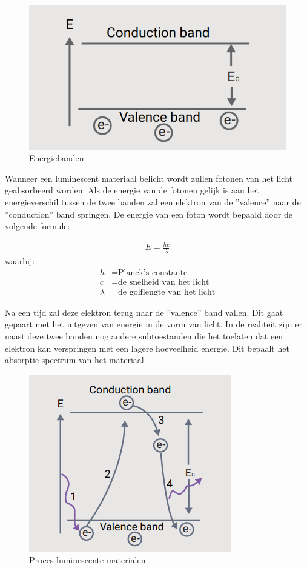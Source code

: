 \begin{figure}[H]
    \centering
    \includegraphics[width=0.6\linewidth]{figs/energy_bands.png}
    \caption{Energiebanden ~\cite{PhosphorModelingLightTools}}%
    \label{fig:energybands}
\end{figure}

Wanneer een luminescent materiaal belicht wordt zullen fotonen van het licht geabsorbeerd worden. Als de energie van de fotonen gelijk is aan het energieverschil tussen de twee banden zal een elektron van de ''valence'' naar de ''conduction'' band springen. De energie van een foton wordt bepaald door de volgende formule:

\begin{align}
E = \frac{hc}{\lambda}\label{eq:energy-foton}
\end{align}
waarbij:
\begin{align*}
h & = \text{Planck's constante} \\
c & = \text{de snelheid van het licht} \\
\lambda & = \text{de golflengte van het licht}
\end{align*}


Na een tijd zal deze elektron terug naar de ''valence'' band vallen. Dit gaat gepaart met het uitgeven van energie in de vorm van licht. In de realiteit zijn er naast deze twee banden nog andere subtoestanden die het toelaten dat een elektron kan verspringen met een lagere hoeveelheid energie. Dit bepaalt het absorptie spectrum van het materiaal.

\begin{figure}[H]
    \centering
    \includegraphics[width=0.6\linewidth]{figs/photolum_process.png}
    \caption{Proces luminescente materialen ~\cite{PhosphorModelingLightTools}}%
    \label{fig:photoluminescent_proc}
\end{figure}

